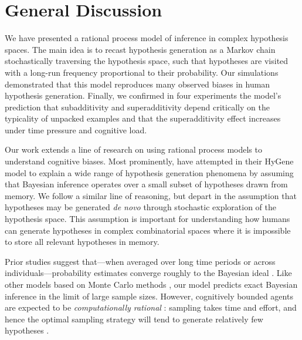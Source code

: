 

\section{General Discussion}

We have presented a rational process model of inference in complex hypothesis spaces. The main idea is to recast hypothesis generation as a Markov chain stochastically traversing the hypothesis space, such that hypotheses are visited with a long-run frequency proportional to their probability. Our simulations demonstrated that this model reproduces many observed biases in human hypothesis generation. Finally, we confirmed in four experiments the model's prediction that subadditivity and superadditivity depend critically on the typicality of unpacked examples and that the superadditivity effect increases under time pressure and cognitive load.

Our work extends a line of research on using rational process models to understand cognitive biases. Most prominently, \citet{Thomas2008} have attempted in their HyGene model to explain a wide range of hypothesis generation phenomena by assuming that Bayesian inference operates over a small subset of hypotheses drawn from memory. We follow a similar line of reasoning, but depart in the assumption that hypotheses may be generated \emph{de novo} through stochastic exploration of the hypothesis space. This assumption is important for understanding how humans can generate hypotheses in complex combinatorial spaces where it is impossible to store all relevant hypotheses in memory.

Prior studies suggest that---when averaged over long time periods or across individuals---probability estimates converge roughly to the Bayesian ideal \citep{Vul2014}. Like other models based on Monte Carlo methods \citep[e.g.,][]{multistability,lieder2017empirical,lieder2017anchoring,shi10}, our model predicts exact Bayesian inference in the limit of large sample sizes. However, cognitively bounded agents are expected to be \emph{computationally rational} \citep{Gershman2015}: sampling takes time and effort, and hence the optimal sampling strategy will tend to generate relatively few hypotheses \citep{Vul2014}. 

